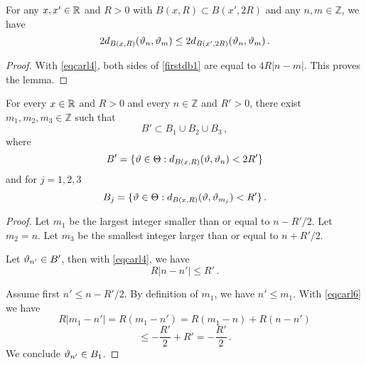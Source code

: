{\begin{lemma}\label{lem sdb1}
    For any $x,x'\in \mathbb{R}$ and $R>0$ with
   $B(x,R)\subset B(x',2R)$  and any $n,m\in \mathbb{Z}$, we have
\begin{equation}\label{seconddb1}
    2d_{B(x,R)}(\vartheta_n,\vartheta_m)\le 2 d_{B(x',2R)}(\vartheta_n,\vartheta_m) \, .
\end{equation}
\end{lemma}
\begin{proof}
With \eqref{eqcarl4}, both sides of \eqref{firstdb1} are equal to $4R|n-m|$. This proves the lemma.
\end{proof}

\begin{lemma}\label{lem tdb1}
    For every $x\in \mathbb{R}$ and $R>0$ and every
    $n\in \mathbb{Z}$ and $R'>0$,
    there exist $m_1, m_2, m_3\in \mathbb{Z}$
    such that
    \begin{equation}\label{eqcarl5}
        B'\subset B_1\cup B_2\cup B_3\, ,
    \end{equation}
where
\begin{equation}
B'=     \{ \vartheta \in \Theta: d_{B(x,R)}(\vartheta, \vartheta_n)<2R'\}
\end{equation}
and for $j=1,2,3$
\begin{equation}
  B_j=
     \{ \vartheta \in \Theta: d_{B(x,R)}(\vartheta, \vartheta_{m_j})<R'\}
     \, .
\end{equation}

\end{lemma}
\begin{proof}
Let $m_1$ be the largest integer smaller than
or equal to
$n-R'/2$.
Let $m_2=n$.
Let $m_3$ be the smallest integer larger than
or equal to $n+R'/2$.

Let $\vartheta_{n'}\in B'$, then with \eqref{eqcarl4},
we have
\begin{equation}\label{eqcarl6}
    R|n-n'|\le R'\, .
\end{equation}

Assume first $n'\le n-R'/2$. By definition of $m_1$,
we have $n'\le m_1$.  With \eqref{eqcarl6}
we have
\begin{equation*}
    R|m_1-n'|=R(m_1-n')=R(m_1-n)+R(n-n')
\end{equation*}
\begin{equation}
    \le -\frac{R'}2+R'=-\frac{R'}2\, .
\end{equation}
We conclude $\vartheta_{n'}\in B_1$.


\end{proof}}
